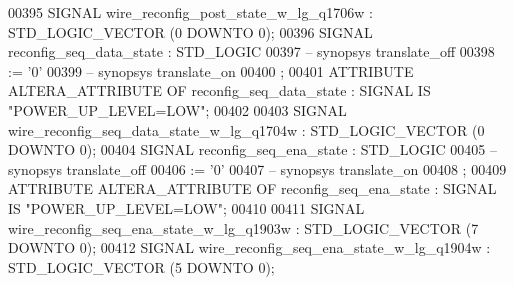 \begin{DoxyCode}
{00395      \textcolor{keywordflow}{SIGNAL}  \textcolor{vhdlchar}{wire_reconfig_post_state_w_lg_q1706w}   \textcolor{vhdlchar}{:}   \textcolor{comment}{STD\_LOGIC\_VECTOR} \textcolor{vhdlchar}{(}\textcolor{vhdllogic}{}\textcolor{vhdllogic}{0} \textcolor{keywordflow}{DOWNTO} \textcolor{vhdllogic}{}\textcolor{vhdllogic}{0}\textcolor{vhdlchar}{)};
00396      \textcolor{keywordflow}{SIGNAL}  \textcolor{vhdlchar}{reconfig_seq_data_state}    \textcolor{vhdlchar}{:}   \textcolor{comment}{STD\_LOGIC}
00397 \textcolor{keyword}{     -- synopsys translate\_off}
00398       \textcolor{vhdlchar}{:=} \textcolor{vhdlchar}{'}\textcolor{vhdllogic}{}\textcolor{vhdllogic}{0}\textcolor{vhdlchar}{'}
00399 \textcolor{keyword}{     -- synopsys translate\_on}
00400      ;
00401      \textcolor{keywordflow}{ATTRIBUTE} \textcolor{vhdlchar}{ALTERA_ATTRIBUTE} \textcolor{keywordflow}{OF} \textcolor{vhdlchar}{reconfig_seq_data_state} \textcolor{vhdlchar}{:} \textcolor{keywordflow}{SIGNAL} \textcolor{keywordflow}{IS} \textcolor{keyword}{"POWER\_UP\_LEVEL=LOW"};
00402 
00403      \textcolor{keywordflow}{SIGNAL}  \textcolor{vhdlchar}{wire_reconfig_seq_data_state_w_lg_q1704w}   \textcolor{vhdlchar}{:}   \textcolor{comment}{STD\_LOGIC\_VECTOR} \textcolor{vhdlchar}{(}\textcolor{vhdllogic}{}\textcolor{vhdllogic}{0} \textcolor{keywordflow}{DOWNTO} \textcolor{vhdllogic}{}\textcolor{vhdllogic}{0}\textcolor{vhdlchar}{)};
00404      \textcolor{keywordflow}{SIGNAL}  \textcolor{vhdlchar}{reconfig_seq_ena_state} \textcolor{vhdlchar}{:}   \textcolor{comment}{STD\_LOGIC}
00405 \textcolor{keyword}{     -- synopsys translate\_off}
00406       \textcolor{vhdlchar}{:=} \textcolor{vhdlchar}{'}\textcolor{vhdllogic}{}\textcolor{vhdllogic}{0}\textcolor{vhdlchar}{'}
00407 \textcolor{keyword}{     -- synopsys translate\_on}
00408      ;
00409      \textcolor{keywordflow}{ATTRIBUTE} \textcolor{vhdlchar}{ALTERA_ATTRIBUTE} \textcolor{keywordflow}{OF} \textcolor{vhdlchar}{reconfig_seq_ena_state} \textcolor{vhdlchar}{:} \textcolor{keywordflow}{SIGNAL} \textcolor{keywordflow}{IS} \textcolor{keyword}{"POWER\_UP\_LEVEL=LOW"};
00410 
00411      \textcolor{keywordflow}{SIGNAL}  \textcolor{vhdlchar}{wire_reconfig_seq_ena_state_w_lg_q1903w}    \textcolor{vhdlchar}{:}   \textcolor{comment}{STD\_LOGIC\_VECTOR} \textcolor{vhdlchar}{(}\textcolor{vhdllogic}{}\textcolor{vhdllogic}{7} \textcolor{keywordflow}{DOWNTO} \textcolor{vhdllogic}{}\textcolor{vhdllogic}{0}\textcolor{vhdlchar}{)};
00412      \textcolor{keywordflow}{SIGNAL}  \textcolor{vhdlchar}{wire_reconfig_seq_ena_state_w_lg_q1904w}    \textcolor{vhdlchar}{:}   \textcolor{comment}{STD\_LOGIC\_VECTOR} \textcolor{vhdlchar}{(}\textcolor{vhdllogic}{}\textcolor{vhdllogic}{5} \textcolor{keywordflow}{DOWNTO} \textcolor{vhdllogic}{}\textcolor{vhdllogic}{0}\textcolor{vhdlchar}{)};
}
\end{DoxyCode}
